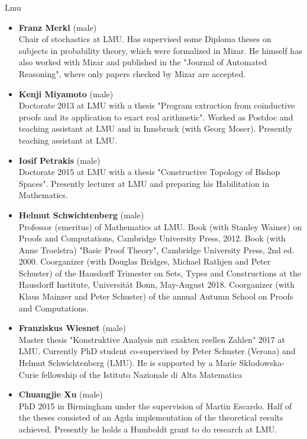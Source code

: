 \begin{sitedescription}{Lmu}
\begin{itemize}
\item \textbf{Franz Merkl} (male)\\
Chair of stochastics at LMU.  Has supervised some
Diploma theses on subjects in probability theory, which were
formalized in Mizar.  He himself has also worked with Mizar and
published in the "Journal of Automated Reasoning", where only papers
checked by Mizar are accepted.

\item \textbf{Kenji Miyamoto} (male)\\
Doctorate 2013 at LMU with a thesis "Program
extraction from coinductive proofs and its application to exact real
arithmetic".  Worked as Postdoc and teaching assistant at LMU and in
Innsbruck (with Georg Moser).  Presently teaching assistant at LMU.

\item \textbf{Iosif Petrakis} (male)\\
Doctorate 2015 at LMU with a thesis  "Constructive
Topology of Bishop Spaces".  Presently lecturer at LMU and preparing
his Habilitation in Mathematics.  

\item \textbf{Helmut Schwichtenberg} (male)\\
Professor (emeritus) of Mathematics at LMU.
Book (with Stanley Wainer) on Proofs and Computations, Cambridge
University Press, 2012.  Book (with Anne Troelstra) "Basic Proof
Theory", Cambridge University Press, 2nd ed. 2000.  Coorganizer (with
Douglas Bridges, Michael Rathjen and Peter Schuster) of the Hausdorff
Trimester on Sets, Types and Constructions at the Hausdorff
Institute, Universit\"at Bonn, May-August 2018.  Coorganizer (with
Klaus Mainzer and Peter Schuster) of the annual Autumn School on
Proofs and Computations.

\item \textbf{Franziskus Wiesnet} (male)\\
Master thesis "Konstruktive Analysis mit exakten
reellen Zahlen" 2017 at LMU.  Currently PhD student co-supervised by
Peter Schuster (Verona) and Helmut Schwichtenberg (LMU).  He is
supported by a Marie Sk{\l}odowska-Curie fellowship of the Istituto
Nazionale di Alta Matematica

\item \textbf{Chuangjie Xu} (male)\\
PhD 2015 in Birmingham under the supervision of Martin
Escardo.  Half of the theses consisted of an Agda implementation of
the theoretical results achieved.  Presently he holds a Humboldt grant
to do research at LMU.


\end{itemize}
\end{sitedescription}
